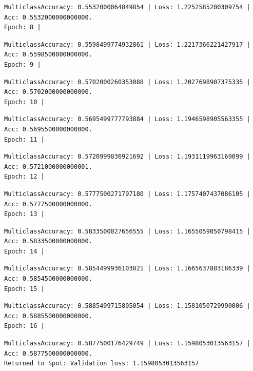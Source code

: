 \documentclass[
  letterpaper,
  DIV=11,
  numbers=noendperiod]{scrreprt}
\begin{document}
\begin{verbatim}
MulticlassAccuracy: 0.5532000064849854 | Loss: 1.2252585200309754 | Acc: 0.5532000000000000.
Epoch: 8 | 
\end{verbatim}

\begin{verbatim}
MulticlassAccuracy: 0.5598499774932861 | Loss: 1.2217366221427917 | Acc: 0.5598500000000000.
Epoch: 9 | 
\end{verbatim}

\begin{verbatim}
MulticlassAccuracy: 0.5702000260353088 | Loss: 1.2027698907375335 | Acc: 0.5702000000000000.
Epoch: 10 | 
\end{verbatim}

\begin{verbatim}
MulticlassAccuracy: 0.5695499777793884 | Loss: 1.1946598905563355 | Acc: 0.5695500000000000.
Epoch: 11 | 
\end{verbatim}

\begin{verbatim}
MulticlassAccuracy: 0.5720999836921692 | Loss: 1.1931119963169099 | Acc: 0.5721000000000001.
Epoch: 12 | 
\end{verbatim}

\begin{verbatim}
MulticlassAccuracy: 0.5777500271797180 | Loss: 1.1757407437086105 | Acc: 0.5777500000000000.
Epoch: 13 | 
\end{verbatim}

\begin{verbatim}
MulticlassAccuracy: 0.5833500027656555 | Loss: 1.1655059050798415 | Acc: 0.5833500000000000.
Epoch: 14 | 
\end{verbatim}

\begin{verbatim}
MulticlassAccuracy: 0.5854499936103821 | Loss: 1.1665637883186339 | Acc: 0.5854500000000000.
Epoch: 15 | 
\end{verbatim}

\begin{verbatim}
MulticlassAccuracy: 0.5885499715805054 | Loss: 1.1581050729990006 | Acc: 0.5885500000000000.
Epoch: 16 | 
\end{verbatim}

\begin{verbatim}
MulticlassAccuracy: 0.5877500176429749 | Loss: 1.1598053013563157 | Acc: 0.5877500000000000.
Returned to Spot: Validation loss: 1.1598053013563157
\end{verbatim}
\end{document}
